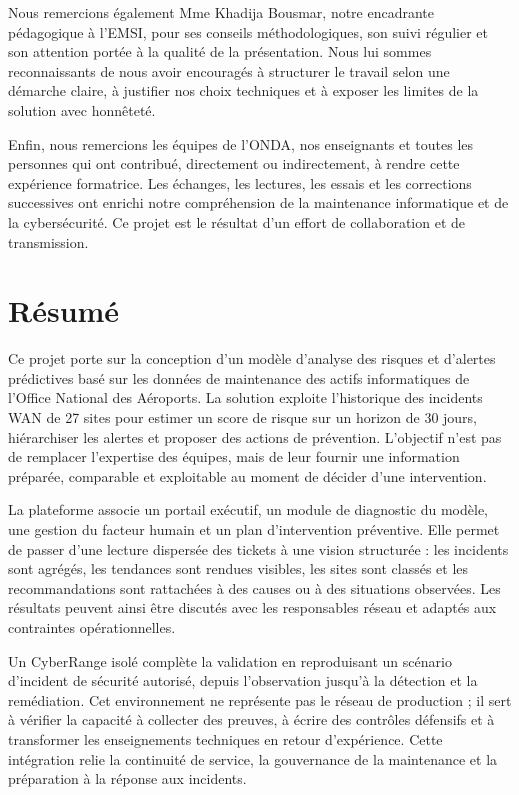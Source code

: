\documentclass[12pt,a4paper,oneside]{report}
\newcommand{\frontchapter}[1]{%
  \chapter*{#1}%
  \addcontentsline{toc}{chapter}{#1}%
}
\begin{document}
Nous remercions également Mme Khadija Bousmar, notre encadrante pédagogique à l’EMSI, pour ses conseils méthodologiques, son suivi régulier et son attention portée à la qualité de la présentation. Nous lui sommes reconnaissants de nous avoir encouragés à structurer le travail selon une démarche claire, à justifier nos choix techniques et à exposer les limites de la solution avec honnêteté.

Enfin, nous remercions les équipes de l’ONDA, nos enseignants et toutes les personnes qui ont contribué, directement ou indirectement, à rendre cette expérience formatrice. Les échanges, les lectures, les essais et les corrections successives ont enrichi notre compréhension de la maintenance informatique et de la cybersécurité. Ce projet est le résultat d’un effort de collaboration et de transmission.

\frontchapter{Résumé}
Ce projet porte sur la conception d’un modèle d’analyse des risques et d’alertes prédictives basé sur les données de maintenance des actifs informatiques de l’Office National des Aéroports. La solution exploite l’historique des incidents WAN de 27 sites pour estimer un score de risque sur un horizon de 30 jours, hiérarchiser les alertes et proposer des actions de prévention. L’objectif n’est pas de remplacer l’expertise des équipes, mais de leur fournir une information préparée, comparable et exploitable au moment de décider d’une intervention.

La plateforme associe un portail exécutif, un module de diagnostic du modèle, une gestion du facteur humain et un plan d’intervention préventive. Elle permet de passer d’une lecture dispersée des tickets à une vision structurée : les incidents sont agrégés, les tendances sont rendues visibles, les sites sont classés et les recommandations sont rattachées à des causes ou à des situations observées. Les résultats peuvent ainsi être discutés avec les responsables réseau et adaptés aux contraintes opérationnelles.

Un CyberRange isolé complète la validation en reproduisant un scénario d’incident de sécurité autorisé, depuis l’observation jusqu’à la détection et la remédiation. Cet environnement ne représente pas le réseau de production ; il sert à vérifier la capacité à collecter des preuves, à écrire des contrôles défensifs et à transformer les enseignements techniques en retour d’expérience. Cette intégration relie la continuité de service, la gouvernance de la maintenance et la préparation à la réponse aux incidents.
\end{document}
